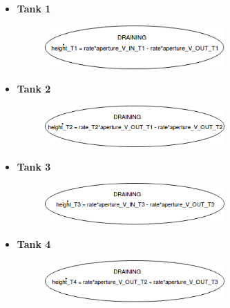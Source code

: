 \documentclass[12pt]{article}
\begin{document}
\begin{itemize}
	\newpage
	\item \textbf{Tank 1}
	\begin{figure}[H]
	\begin{center}
	\includegraphics[width=0.65\textwidth]{images/tank1.png}
	\end{center}
	\end{figure}
	
	\item \textbf{Tank 2}
	\begin{figure}[H]
	\begin{center}
	\includegraphics[width=0.65\textwidth]{images/tank2.png}
	\end{center}
	\end{figure}
	
	\item \textbf{Tank 3}
	\begin{figure}[H]
	\begin{center}
	\includegraphics[width=0.65\textwidth]{images/tank3.png}
	\end{center}
	\end{figure}
	
	\item \textbf{Tank 4}
	\begin{figure}[H]
	\begin{center}
	\includegraphics[width=0.65\textwidth]{images/tank4.png}
	\end{center}
	\end{figure}
\end{itemize}
\end{document}
